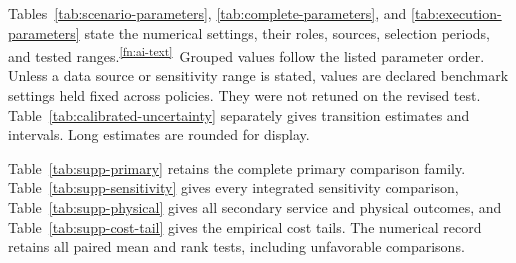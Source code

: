 \documentclass[journal]{IEEEtran}
\newcommand{\AITextRef}{\textsuperscript{\ref{fn:ai-text}}} %
\providecommand{\DIFadd}[1]{{\protect\color{blue}\uwave{#1}}} %
\renewcommand{\DIFadd}[1]{{\color{blue}#1}}
\begin{document}
\label{app:parameters}

\DIFadd{Tables~\ref{tab:scenario-parameters}, \ref{tab:complete-parameters}, and \ref{tab:execution-parameters} state the numerical settings, their roles, sources, selection periods, and tested ranges.\AITextRef\ Grouped values follow the listed parameter order. Unless a data source or sensitivity range is stated, values are declared benchmark settings held fixed across policies. They were not retuned on the revised test. Table~\ref{tab:calibrated-uncertainty} separately gives transition estimates and intervals. Long estimates are rounded for display.
}

\DIFadd{Table~\ref{tab:supp-primary} retains the complete primary comparison family. Table~\ref{tab:supp-sensitivity} gives every integrated sensitivity comparison, Table~\ref{tab:supp-physical} gives all secondary service and physical outcomes, and Table~\ref{tab:supp-cost-tail} gives the empirical cost tails. The numerical record retains all paired mean and rank tests, including unfavorable comparisons.
}
\end{document}
